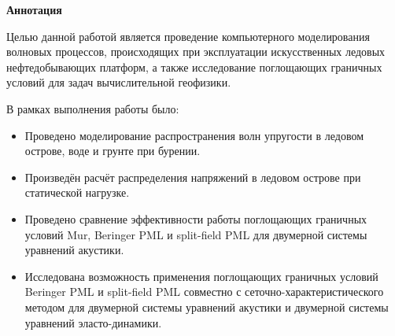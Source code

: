 \thispagestyle{plain}
\begin{center}
    \Large
    \textbf{Аннотация}
\end{center}

Целью данной работой является проведение  компьютерного моделирования волновых процессов, происходящих при эксплуатации искусственных ледовых нефтедобывающих платформ, а также исследование  поглощающих граничных условий для задач вычислительной геофизики.

В рамках выполнения работы было:
\begin{itemize}
    \item Проведено моделирование распространения волн упругости в ледовом острове, воде и грунте при бурении.
    \item Произведён расчёт распределения напряжений в ледовом острове при статической нагрузке.
    \item Проведено сравнение эффективности работы поглощающих граничных условий Mur, Beringer PML и split-field PML для двумерной системы уравнений акустики.
    \item Исследована возможность применения поглощающих граничных условий Beringer PML и split-field PML совместно с сеточно-характеристического методом для двумерной системы уравнений акустики и двумерной системы уравнений эласто-динамики.
\end{itemize}

\newpage